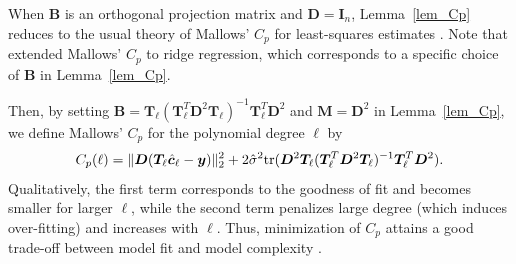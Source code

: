 \documentclass[final,onefignum,onetabnum]{siamart220329}
\newcommand{\vct}[1]{\bm{#1}}
\newcommand{\mtx}[1]{\bm{#1}}
\begin{document}
When $\mtx{B}$ is an orthogonal projection matrix and $\mtx{D}=\mtx{I}_n$, Lemma~\ref{lem_Cp} reduces to the usual theory of Mallows' $C_p$ for least-squares estimates \cite{james2013introduction}.
Note that \cite{yanagihara2010unbiased} extended Mallows' $C_p$ to ridge regression, which corresponds to a specific choice of $\mtx{B}$ in Lemma~\ref{lem_Cp}.

Then, by setting $\mtx{B}=\mtx{T}_{\ell} (\mtx{T}_{\ell}^T \mtx{D}^2 \mtx{T}_{\ell})^{-1} \mtx{T}_{\ell}^T \mtx{D}^2$ and $\mtx{M}=\mtx{D}^2$ in Lemma~\ref{lem_Cp}, we define Mallows' $C_p$ for the polynomial degree $\ell$ by
\begin{align}\label{Cpdef}
	C_p(\ell) = \|\mtx{D} (\mtx{T}_{\ell} \hat{\vct{c}}_{\ell} - \vct{y})\|_2^2 + 2  \hat{\sigma}^2 {\rm tr} (\mtx{D}^2 \mtx{T}_{\ell} (\mtx{T}_{\ell}^T \mtx{D}^2 \mtx{T}_{\ell})^{-1} \mtx{T}_{\ell}^T \mtx{D}^2).
\end{align}
Qualitatively, the first term corresponds to the goodness of fit and becomes smaller for larger $\ell$, while the second term penalizes large degree (which induces over-fitting) and  increases with $\ell$.
Thus, minimization of $C_p$ attains a good trade-off between model fit and model complexity \cite{james2013introduction}.
\end{document}
